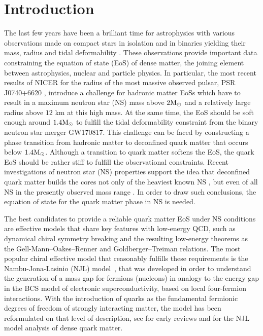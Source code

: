 \documentclass[%
 reprint,
superscriptaddress,
nofootinbib,
 amsmath,amssymb,
 aps,
]{revtex4-1}
\begin{document}
\section{Introduction}
{The last few years have been a brilliant time for astrophysics with various observations made on compact stars in isolation and in binaries yielding their mass, radius and tidal deformability \cite{riley2021nicer, miller2021radius, dietrich2020multimessenger, abbott2018gw170817, fonseca2021refined, miller2019psr}. These observations provide important data constraining the equation of state (EoS) of dense matter, the joining element between astrophysics, nuclear and particle physics. In particular, the most recent results of NICER for the radius of the most massive observed pulsar, PSR J0740+6620 \cite{riley2021nicer, miller2021radius}, introduce a challenge for hadronic matter EoSs which have to result in a maximum neutron star (NS) mass above $2\textmd{M}_{\odot}$ and a relatively large radius above $12$ km at this high mass. 
At the same time, the EoS should be soft enough around $1.4\textmd{M}_{\odot}$ to fulfill the tidal deformability constraint from the binary neutron star merger GW170817. 
This challenge can be faced by constructing a phase transition from hadronic matter to deconfined quark matter that occurs below $1.4\textmd{M}_{\odot}$. 
Although a transition to quark matter softens the EoS, the quark EoS should be rather stiff to fulfill the observational constraints.}
Recent investigations of neutron star (NS) properties support the idea that deconfined quark matter builds the cores not only of the heaviest known NS \cite{Annala:2019puf}, but even of all NS in the presently observed mass range \cite{Blaschke:2020qqj}. In order to draw such conclusions, the equation of state for the quark matter phase in NS is needed. 
%

The best candidates to provide a reliable quark matter EoS under NS conditions are effective models that share key features with low-energy QCD, such as dynamical chiral symmetry breaking and the resulting low-energy theorems as the Gell-Mann--Oakes--Renner and Goldberger--Treiman relations.  
The most popular chiral effective model that reasonably fulfills these requirements is the Nambu-Jona-Lasinio (NJL) model~\cite{Nambu:1961tp,Nambu:1961fr}, that was developed in order to understand the generation of a mass gap for fermions (nucleons) in analogy to the energy gap in the BCS model of electronic superconductivity, based  on local four-fermion interactions. 
With the introduction of quarks as the fundamental fermionic degrees of freedom of strongly interacting matter, the model has been reformulated on that level of description, see \cite{Eguchi:1976iz,Volkov:1984kq,Vogl:1989ea,Klimt:1989pm,Klevansky:1992qe,Ebert:1994mf,Hatsuda:1994pi} for early reviews and \cite{Buballa:2003qv} for the NJL model analysis of dense quark matter.   
\end{document}
